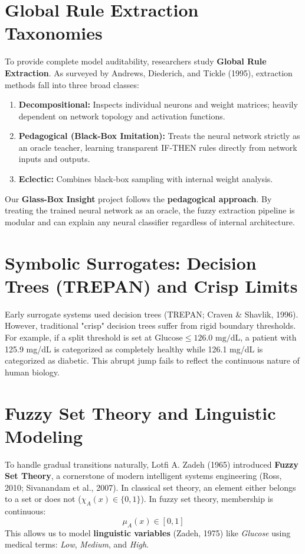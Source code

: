 \documentclass{report}
\begin{document}
\section{Global Rule Extraction Taxonomies}

To provide complete model auditability, researchers study \textbf{Global Rule Extraction}. As surveyed by Andrews, Diederich, and Tickle (1995), extraction methods fall into three broad classes:
\begin{enumerate}
    \setlength{\itemsep}{0pt}
    \setlength{\parskip}{0pt}
    \item \textbf{Decompositional:} Inspects individual neurons and weight matrices; heavily dependent on network topology and activation functions.
    \item \textbf{Pedagogical (Black-Box Imitation):} Treats the neural network strictly as an oracle teacher, learning transparent IF-THEN rules directly from network inputs and outputs.
    \item \textbf{Eclectic:} Combines black-box sampling with internal weight analysis.
\end{enumerate}
Our \textbf{Glass-Box Insight} project follows the \textbf{pedagogical approach}. By treating the trained neural network as an oracle, the fuzzy extraction pipeline is modular and can explain any neural classifier regardless of internal architecture.

\section{Symbolic Surrogates: Decision Trees (TREPAN) and Crisp Limits}

Early surrogate systems used decision trees (TREPAN; Craven \& Shavlik, 1996). However, traditional "crisp" decision trees suffer from rigid boundary thresholds. For example, if a split threshold is set at $\text{Glucose} \le 126.0\text{ mg/dL}$, a patient with 125.9 mg/dL is categorized as completely healthy while 126.1 mg/dL is categorized as diabetic. This abrupt jump fails to reflect the continuous nature of human biology.

\section{Fuzzy Set Theory and Linguistic Modeling}

To handle gradual transitions naturally, Lotfi A. Zadeh (1965) introduced \textbf{Fuzzy Set Theory}, a cornerstone of modern intelligent systems engineering (Ross, 2010; Sivanandam et al., 2007). In classical set theory, an element either belongs to a set or does not ($\chi_A(x) \in \{0, 1\}$). In fuzzy set theory, membership is continuous:
\begin{equation}
    \mu_A(x) \in [0, 1]
\end{equation}
This allows us to model \textbf{linguistic variables} (Zadeh, 1975) like \textit{Glucose} using medical terms: \textit{Low}, \textit{Medium}, and \textit{High}.
\end{document}
